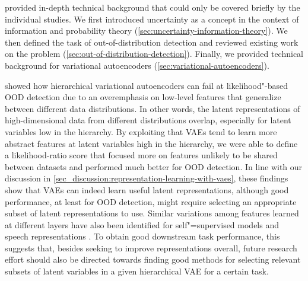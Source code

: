

\vspace{1em}
\textbf{} provided in-depth technical background that could only be covered briefly by the individual studies. 
We first introduced uncertainty as a concept in the context of information and probability theory (\cref{sec:uncertainty-information-theory}). We then defined the task of out-of-distribution detection and reviewed existing work on the problem (\cref{sec:out-of-distribution-detection}). Finally, we provided technical background for variational autoencoders (\cref{sec:variational-autoencoders}).

\vspace{1em}
\textbf{} showed how hierarchical variational autoencoders can fail at likelihood"-based OOD detection due to an overemphasis on low-level features that generalize between different data distributions. 
In other words, the latent representations of high-dimensional data from different distributions overlap, especially for latent variables low in the hierarchy.
By exploiting that VAEs tend to learn more abstract features at latent variables high in the hierarchy, we were able to define a likelihood-ratio score that focused more on features unlikely to be shared between datasets and performed much better for OOD detection. 
In line with our discussion in \cref{sec_discussion:representation-learning-with-vaes}, these findings show that VAEs can indeed learn useful latent representations, although good performance, at least for OOD detection, might require selecting an appropriate subset of latent representations to use. 
Similar variations among features learned at different layers have also been identified for self"=supervised models and speech representations \parencite{pasad_layerwise_2021}. 
To obtain good downstream task performance, this suggests that, besides seeking to improve representations overall, future research effort should also be directed towards finding good methods for selecting relevant subsets of latent variables in a given hierarchical VAE for a certain task.

